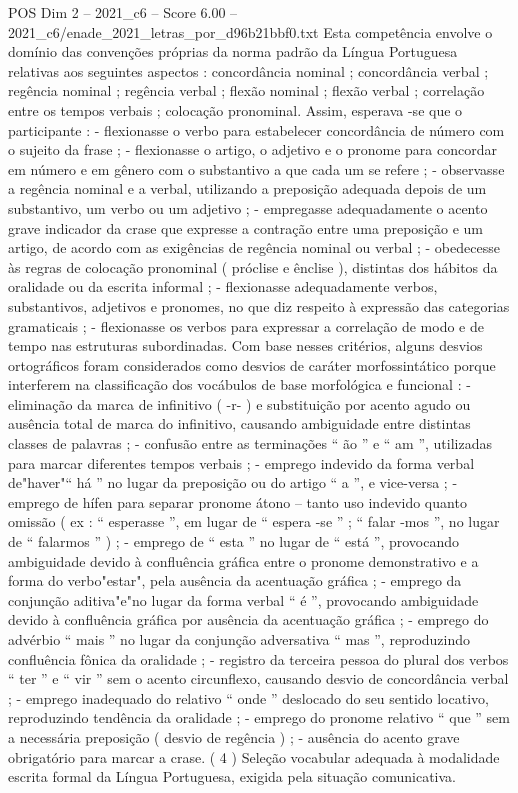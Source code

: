\begin{textsample}{POS Dim 2 – 2021\_c6 – Score 6.00 – 2021\_c6/enade\_2021\_letras\_por\_d96b21bbf0.txt}
Esta competência envolve o domínio das convenções próprias da norma padrão da Língua Portuguesa relativas aos seguintes aspectos : concordância nominal ; concordância verbal ; regência nominal ; regência verbal ; flexão nominal ; flexão verbal ; correlação entre os tempos verbais ; colocação pronominal.
Assim, esperava -se que o participante : - flexionasse o verbo para estabelecer concordância de número com o sujeito da frase ; - flexionasse o artigo, o adjetivo e o pronome para concordar em número e em gênero com o substantivo a que cada um se refere ; - observasse a regência nominal e a verbal, utilizando a preposição adequada depois de um substantivo, um verbo ou um adjetivo ; - empregasse adequadamente o acento grave indicador da crase que expresse a contração entre uma preposição e um artigo, de acordo com as exigências de regência nominal ou verbal ; - obedecesse às regras de colocação pronominal ( próclise e ênclise ), distintas dos hábitos da oralidade ou da escrita informal ; - flexionasse adequadamente verbos, substantivos, adjetivos e pronomes, no que diz respeito à expressão das categorias gramaticais ; - flexionasse os verbos para expressar a correlação de modo e de tempo nas estruturas subordinadas.
Com base nesses critérios, alguns desvios ortográficos foram considerados como desvios de caráter morfossintático porque interferem na classificação dos vocábulos de base morfológica e funcional : - eliminação da marca de infinitivo ( -r- ) e substituição por acento agudo ou ausência total de marca do infinitivo, causando ambiguidade entre distintas classes de palavras ; - confusão entre as terminações “ ão ” e “ am ”, utilizadas para marcar diferentes tempos verbais ; - emprego indevido da forma verbal de"haver"“ há ” no lugar da preposição ou do artigo “ a ”, e vice-versa ; - emprego de hífen para separar pronome átono – tanto uso indevido quanto omissão ( ex : “ esperasse ”, em lugar de “ espera -se ” ; “ falar -mos ”, no lugar de “ falarmos ” ) ; - emprego de “ esta ” no lugar de “ está ”, provocando ambiguidade devido à confluência gráfica entre o pronome demonstrativo e a forma do verbo"estar", pela ausência da acentuação gráfica ; - emprego da conjunção aditiva"e"no lugar da forma verbal “ é ”, provocando ambiguidade devido à confluência gráfica por ausência da acentuação gráfica ; - emprego do advérbio “ mais ” no lugar da conjunção adversativa “ mas ”, reproduzindo confluência fônica da oralidade ; - registro da terceira pessoa do plural dos verbos “ ter ” e “ vir ” sem o acento circunflexo, causando desvio de concordância verbal ; - emprego inadequado do relativo “ onde ” deslocado do seu sentido locativo, reproduzindo tendência da oralidade ; - emprego do pronome relativo “ que ” sem a necessária preposição ( desvio de regência ) ; - ausência do acento grave obrigatório para marcar a crase. ( 4 ) Seleção vocabular adequada à modalidade escrita formal da Língua Portuguesa, exigida pela situação comunicativa.

\end{textsample}

